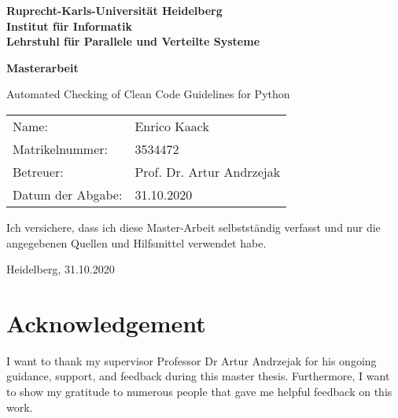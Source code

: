 \documentclass[
     12pt,                    %
     a4paper,             %
     BCOR10mm,     %
     DIV14,                 %
     listof=totoc,                    %
     bibliography=totoc,       %
     index=totoc,              %
     twoside,
     headsepline
     ]{scrreprt}
\begin{document}
\begin{titlepage}


\vspace*{1cm}
\begin{center}
\vspace*{3cm}
\textbf{ 
\Large Ruprecht-Karls-Universität Heidelberg\\
\smallskip
\Large Institut für Informatik\\
\smallskip
\Large Lehrstuhl für Parallele und Verteilte Systeme\\
\smallskip
}

\vspace{3cm}

\textbf{\large Masterarbeit} 

\vspace{0.5\baselineskip}
{\huge
Automated Checking of Clean Code Guidelines for Python
}
\end{center}
\vfill 

{\large
\begin{tabular}[l]{ll}
Name: & Enrico Kaack\\
Matrikelnummer: & 3534472\\
Betreuer: & Prof. Dr. Artur Andrzejak\\
Datum der Abgabe: & 31.10.2020
\end{tabular}
}

\end{titlepage}

\onehalfspacing

\thispagestyle{empty}

\vspace*{100pt}
\noindent
Ich versichere, dass ich diese Master-Arbeit selbstständig verfasst und nur die angegebenen
Quellen und Hilfsmittel verwendet habe.

\vspace*{50pt}

\noindent
Heidelberg, 31.10.2020
\cleardoublepage






\newpage
\section*{Acknowledgement}
I want to thank my supervisor Professor Dr Artur Andrzejak for his ongoing guidance, support, and feedback during this master thesis.
Furthermore, I want to show my gratitude to numerous people that gave me helpful feedback on this work.
\end{document}
